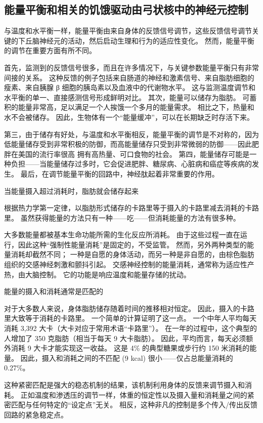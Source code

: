 \subsection{能量平衡和相关的饥饿驱动由弓状核中的神经元控制}

与温度和水平衡一样，能量平衡由来自身体的反馈信号调节，这些反馈信号调节关键的下丘脑神经元的活动，然后启动生理和行为的适应性变化。
然而，能量平衡的调节在重要方面有所不同。


首先，监测到的反馈信号很多，而且在许多情况下，与关键参数能量平衡只有非常间接的关系。
这种反馈的例子包括来自肠道的神经和激素信号、来自脂肪细胞的瘦素、来自胰腺 β 细胞的胰岛素以及血液中的代谢物水平。
这与监测温度调节和水平衡的单一、直接感测信号形成鲜明对比。
其次，能量可以储存为脂肪。
可蓄积的能量非常高，足以满足一个人挨饿一个多月的能量需求。 相比之下，热量和水不会被储存。
因此，生物体有一个“能量缓冲”，可以在长期缺乏时存活下来。


第三，由于储存有好处，与温度和水平衡相反，能量平衡的调节是不对称的，因为低能量储存受到非常积极的防御，而高能量储存只受到非常微弱的防御——因此肥胖在美国的流行率很高 拥有高热量、可口食物的社会。
第四，能量储存可能是一种负担——当能量储存过多时，它会促进肥胖、糖尿病、心脏病和癌症等疾病的发生。
最后，在调节能量平衡的回路中，神经肽起着非常重要的作用。


当能量摄入超过消耗时，脂肪就会储存起来

根据热力学第一定律，以脂肪形式储存的卡路里等于摄入的卡路里减去消耗的卡路里。
虽然获得能量的方法只有一种——吃——但消耗能量的方法有很多种。


大多数能量都被基本生命功能所需的生化反应所消耗。
由于这些过程一直在运行，因此这种“强制性能量消耗”是固定的，不受监管。
然而，另外两种类型的能量消耗却截然不同；
一种是自愿的身体活动，而另一种是非自愿的，由棕色脂肪组织的交感神经刺激和颤抖引起。
交感神经控制的能量消耗，通常称为适应性产热，由大脑控制。
它的功能是响应温度和能量存储的扰动。


能量的摄入和消耗通常是匹配的

对于大多数人来说，身体脂肪储存随着时间的推移相对恒定。
因此，摄入的卡路里大致等于消耗的卡路里。 一个简单的计算证明了这一点。
一个中年人平均每天消耗 3,392 大卡（大卡对应于常用术语“卡路里”）。
在一年的过程中，这个典型的人增加了 350 克脂肪（相当于每天 9 大卡脂肪）。
因此，平均而言，每天必须额外消耗 9 大卡才能实现这一收益。
这是 4\% 的典型糖果或步行约 150 米消耗的能量。
因此，摄入和消耗之间的不匹配 (9 kcal) 很小——仅占总能量消耗的 0.27\%。


这种紧密匹配是强大的稳态机制的结果，该机制利用身体的反馈来调节摄入和消耗。
正如温度和渗透压的调节一样，体重的恒定性以及摄入量和消耗量之间的紧密匹配与任何特定的“设定点”无关。
相反，这种非凡的控制是多个传入/传出反馈回路的紧急稳定点。


